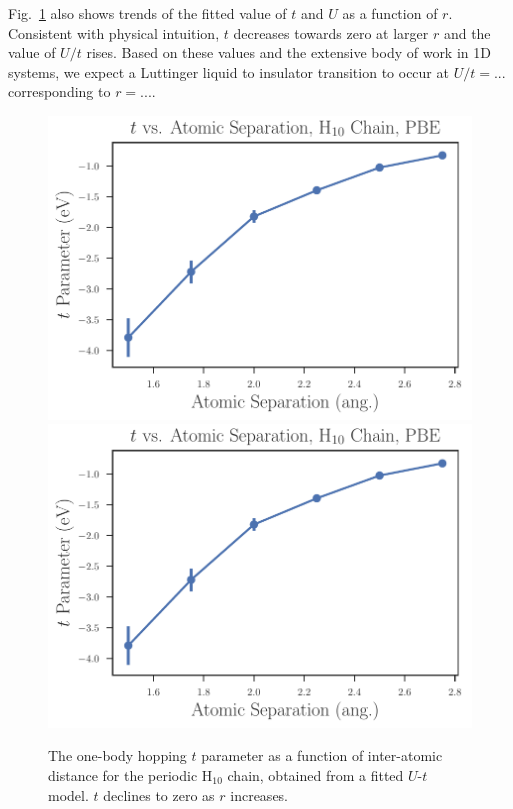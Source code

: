 Fig.~\ref{fig:Parameters-vs-Bond-t} also shows trends of the fitted value of $t$ 
and $U$ as a function of $r$. Consistent with physical intuition, $t$ decreases towards zero at larger $r$
and the value of $U/t$ rises. Based on these values and the extensive body of work in 1D systems, we expect a Luttinger liquid 
to insulator transition to occur at $U/t=...$ corresponding to $r=...$.  

\begin{figure}
\centering
\includegraphics[scale=0.5]{./Figures/$t$_vs_separation_h_chain_ols.pdf}
\includegraphics[scale=0.5]{./Figures/$t$_vs_separation_h_chain_ols.pdf}
\caption{ The one-body hopping $t$ parameter as a function of inter-atomic distance for the periodic H$_{10}$ chain, obtained from a fitted $U$-$t$ model. $t$ declines to zero as $r$ increases. }\label{fig:Parameters-vs-Bond-t}
\end{figure}
